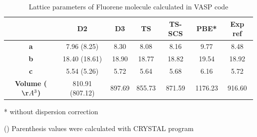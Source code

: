  				\begin{table}[H]
 					\caption{Lattice parameters of Fluorene molecule calculated in VASP code}  \label{table-fluorenesol}
 					\begin{center}
 						\begin{threeparttable}
 						\begin{tabular}{c c c c c c c}
 							\toprule
 							& \textbf{D2} & \textbf{D3} & \textbf{TS} & \textbf{TS-SCS} & \textbf{PBE*} & \textbf{Exp} ref\cite{belsky1984fluorene}\\
 							\midrule
 							\textbf{a} & 7.96 (8.25) & 8.30 & 8.08 & 8.16 & 9.77 & 8.48 \\
 							\textbf{b}& 18.40 (18.61) & 18.90 & 18.77 & 18.82 & 19.54 & 18.92\\
 							\textbf{c}& 5.54 (5.26) & 5.72 & 5.64 & 5.68 & 6.16 & 5.72\\
 							\textbf{Volume ($\AA^{3}$)}& 810.91 (807.12) & 897.69 & 855.73 & 871.59 & 1176.23 & 916.60\\
 							\bottomrule
 						\end{tabular}
 						
 						\begin{tablenotes}
 							\item[*] without dispersion correction
 							\item[()] Parenthesis values were calculated with CRYSTAL program
 						\end{tablenotes}
 					\end{threeparttable}
 					\end{center}
 				\end{table}
 				

